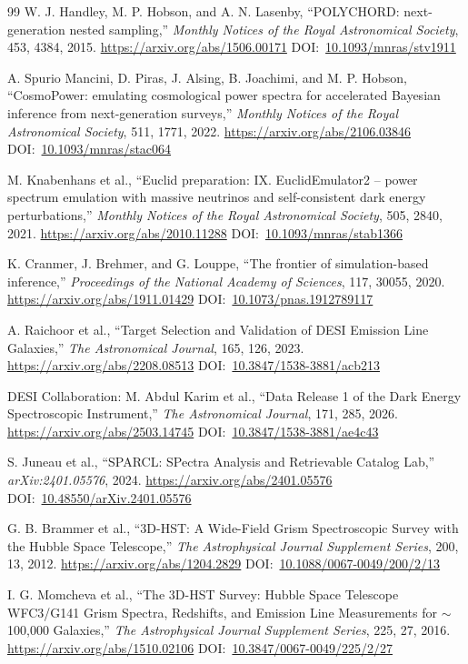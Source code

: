 \documentclass[10pt,onecolumn]{article}
\newcommand{\doi}[1]{DOI:~\href{https://doi.org/#1}{#1}}
\begin{document}
\begin{thebibliography}{99}
W. J. Handley, M. P. Hobson, and A. N. Lasenby,
``POLYCHORD: next-generation nested sampling,''
\emph{Monthly Notices of the Royal Astronomical Society}, 453, 4384, 2015.
\url{https://arxiv.org/abs/1506.00171}
\doi{10.1093/mnras/stv1911}

A. Spurio Mancini, D. Piras, J. Alsing, B. Joachimi, and M. P. Hobson,
``CosmoPower: emulating cosmological power spectra for accelerated Bayesian inference from next-generation surveys,''
\emph{Monthly Notices of the Royal Astronomical Society}, 511, 1771, 2022.
\url{https://arxiv.org/abs/2106.03846}
\doi{10.1093/mnras/stac064}

M. Knabenhans et al.,
``Euclid preparation: IX. EuclidEmulator2 -- power spectrum emulation with massive neutrinos and self-consistent dark energy perturbations,''
\emph{Monthly Notices of the Royal Astronomical Society}, 505, 2840, 2021.
\url{https://arxiv.org/abs/2010.11288}
\doi{10.1093/mnras/stab1366}

K. Cranmer, J. Brehmer, and G. Louppe,
``The frontier of simulation-based inference,''
\emph{Proceedings of the National Academy of Sciences}, 117, 30055, 2020.
\url{https://arxiv.org/abs/1911.01429}
\doi{10.1073/pnas.1912789117}

A. Raichoor et al.,
``Target Selection and Validation of DESI Emission Line Galaxies,''
\emph{The Astronomical Journal}, 165, 126, 2023.
\url{https://arxiv.org/abs/2208.08513}
\doi{10.3847/1538-3881/acb213}

DESI Collaboration: M. Abdul Karim et al.,
``Data Release 1 of the Dark Energy Spectroscopic Instrument,''
\emph{The Astronomical Journal}, 171, 285, 2026.
\url{https://arxiv.org/abs/2503.14745}
\doi{10.3847/1538-3881/ae4c43}

S. Juneau et al.,
``SPARCL: SPectra Analysis and Retrievable Catalog Lab,''
\emph{arXiv:2401.05576}, 2024.
\url{https://arxiv.org/abs/2401.05576}
\doi{10.48550/arXiv.2401.05576}

G. B. Brammer et al.,
``3D-HST: A Wide-Field Grism Spectroscopic Survey with the Hubble Space Telescope,''
\emph{The Astrophysical Journal Supplement Series}, 200, 13, 2012.
\url{https://arxiv.org/abs/1204.2829}
\doi{10.1088/0067-0049/200/2/13}

I. G. Momcheva et al.,
``The 3D-HST Survey: Hubble Space Telescope WFC3/G141 Grism Spectra, Redshifts, and Emission Line Measurements for $\sim$100,000 Galaxies,''
\emph{The Astrophysical Journal Supplement Series}, 225, 27, 2016.
\url{https://arxiv.org/abs/1510.02106}
\doi{10.3847/0067-0049/225/2/27}


\end{thebibliography}
\end{document}
